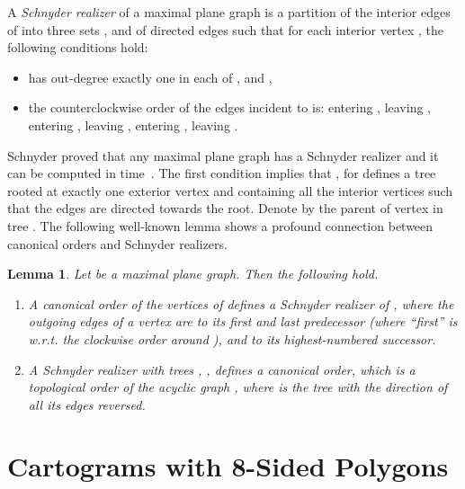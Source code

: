\documentclass[11pt]{article}
\newtheorem{lemma}{Lemma}[section]
\begin{document}
A \textit{Schnyder realizer} of a maximal plane graph  is a partition of the interior
 edges of  into three sets ,  and  of
 directed edges such that for each interior vertex , the following conditions hold:

\begin{itemize}
    \item  has out-degree exactly one in each of ,  and ,
    \item the counterclockwise order of the edges incident to  is: entering , leaving ,
    entering , leaving , entering , leaving .
\end{itemize}

Schnyder proved that any maximal plane graph has a Schnyder realizer
and it can be computed in  time~\cite{s-epgg-90}. The first
condition implies that , for  defines a tree rooted at exactly
 one exterior vertex and containing all the interior vertices such that the edges are directed towards the root.
 Denote by  the parent of vertex  in tree .
The following well-known lemma shows a profound connection between canonical orders and Schnyder realizers.

\begin{lemma}
\label{lemma:can-schny} Let  be a maximal plane graph. Then the following hold.
    \begin{enumerate}
        \item[(a)] A canonical order of the vertices of  defines a Schnyder realizer of , where the
            outgoing edges of a vertex  are to its first and last predecessor (where ``first'' is
            w.r.t. the clockwise order around ), and to its highest-numbered successor.
        \item[(b)] A Schnyder realizer with trees , ,  defines a canonical order,
            which is a topological order of the acyclic graph ,
            where  is the tree  with the direction of all its edges reversed.
    \end{enumerate}
\end{lemma}
















\section{Cartograms with 8-Sided Polygons}
\label{sec:eight-side}
\end{document}
